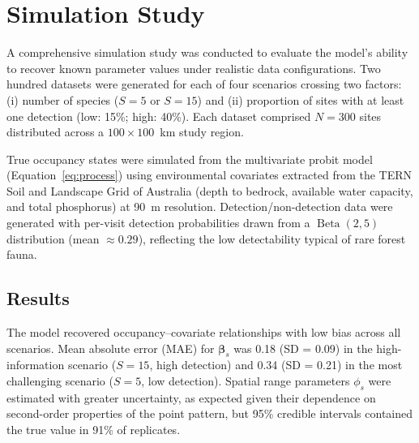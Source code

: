\section{Simulation Study}

A comprehensive simulation study was conducted to evaluate the model's ability
to recover known parameter values under realistic data configurations.
Two hundred datasets were generated for each of four scenarios crossing two
factors: (i) number of species ($S = 5$ or $S = 15$) and (ii) proportion of
sites with at least one detection (low: 15\%; high: 40\%). Each dataset
comprised $N = 300$ sites distributed across a $100 \times 100$~km study region.

True occupancy states were simulated from the multivariate probit model
(Equation~\ref{eq:process}) using environmental covariates extracted from the
TERN Soil and Landscape Grid of Australia (depth to bedrock, available water
capacity, and total phosphorus) at 90~m resolution. Detection/non-detection
data were generated with per-visit detection probabilities drawn from a
$\operatorname{Beta}(2,5)$ distribution (mean $\approx 0.29$), reflecting the
low detectability typical of rare forest fauna.

\subsection{Results}

The model recovered occupancy--covariate relationships with low bias across all
scenarios. Mean absolute error (MAE) for $\boldsymbol{\beta}_s$ was 0.18
(SD = 0.09) in the high-information scenario ($S = 15$, high detection) and
0.34 (SD = 0.21) in the most challenging scenario ($S = 5$, low detection).
Spatial range parameters $\phi_s$ were estimated with greater uncertainty, as
expected given their dependence on second-order properties of the point pattern,
but 95\% credible intervals contained the true value in 91\% of replicates.

